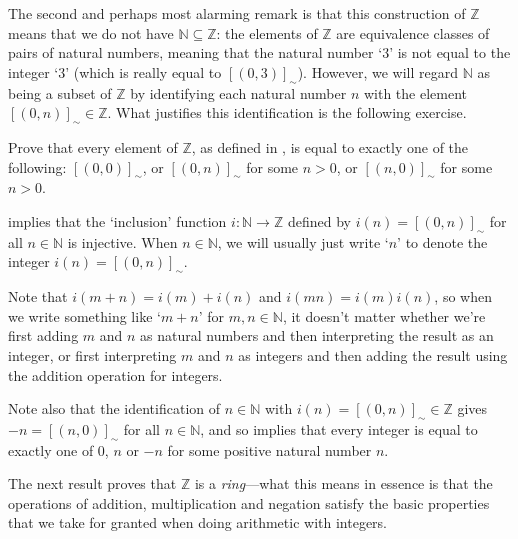 The second and perhaps most alarming remark is that this construction of $\mathbb{Z}$ means that we do not have $\mathbb{N} \subseteq \mathbb{Z}$: the elements of $\mathbb{Z}$ are equivalence classes of pairs of natural numbers, meaning that the natural number `$3$' is not equal to the integer `$3$' (which is really equal to $[(0,3)]_{\sim}$). However, we will regard $\mathbb{N}$ as being a subset of $\mathbb{Z}$ by identifying each natural number $n$ with the element $[(0,n)]_{\sim} \in \mathbb{Z}$. What justifies this identification is the following exercise.

\begin{exercise}
\label{exRepresentativesOfElementsOfZ}
Prove that every element of $\mathbb{Z}$, as defined in , is equal to exactly one of the following: $[(0,0)]_{\sim}$, or $[(0,n)]_{\sim}$ for some $n>0$, or $[(n,0)]_{\sim}$ for some $n>0$.
\end{exercise}

 implies that the `inclusion' function $i : \mathbb{N} \to \mathbb{Z}$ defined by $i(n) = [(0,n)]_{\sim}$ for all $n \in \mathbb{N}$ is injective. When $n \in \mathbb{N}$, we will usually just write `$n$' to denote the integer $i(n) = [(0,n)]_{\sim}$.

Note that $i(m+n) = i(m)+i(n)$ and $i(mn) = i(m)i(n)$, so when we write something like `$m+n$' for $m,n \in \mathbb{N}$, it doesn't matter whether we're first adding $m$ and $n$ as natural numbers and then interpreting the result as an integer, or first interpreting $m$ and $n$ as integers and then adding the result using the addition operation for integers.

Note also that the identification of $n \in \mathbb{N}$ with $i(n) = [(0,n)]_{\sim} \in \mathbb{Z}$ gives $-n = [(n,0)]_{\sim}$ for all $n \in \mathbb{N}$, and so  implies that every integer is equal to exactly one of $0$, $n$ or $-n$ for some positive natural number $n$.

The next result proves that $\mathbb{Z}$ is a \textit{ring}---what this means in essence is that the operations of addition, multiplication and negation satisfy the basic properties that we take for granted when doing arithmetic with integers.


